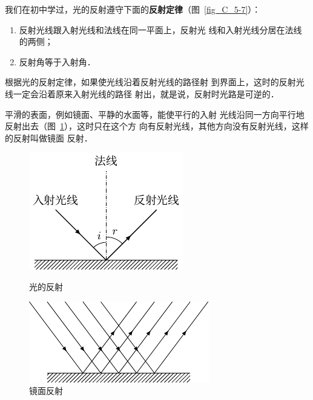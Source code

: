 我们在初中学过，光的反射遵守下面的\textbf{反射定律}（图~\ref{fig_C_5-7}）：

\begin{enumerate}
    \item 反射光线跟入射光线和法线在同一平面上，反射光
线和入射光线分居在法线的两侧；
\item 反射角等于入射角．
\end{enumerate}

根据光的反射定律，如果使光线沿着反射光线的路径射
到界面上，这时的反射光线一定会沿着原来入射光线的路径
射出，就是说，反射时光路是可逆的．

平滑的表面，例如镜面、平静的水面等，能使平行的入射
光线沿同一方向平行地反射出去（图~\ref{fig_C_5-8}），这时只在这个方
向有反射光线，其他方向没有反射光线，这样的反射叫做镜面
反射．
\begin{figure}[htbp]
    \centering
    \begin{minipage}[t]{0.48\textwidth}
        \centering
        \includegraphics{fig/C/5-7.pdf}
        \caption{光的反射}\label{fig_C_5-7}
    \end{minipage}
    \begin{minipage}[t]{0.48\textwidth}
        \centering
        \includegraphics{fig/C/5-8.pdf}
        \caption{镜面反射}\label{fig_C_5-8}
    \end{minipage}
\end{figure}

